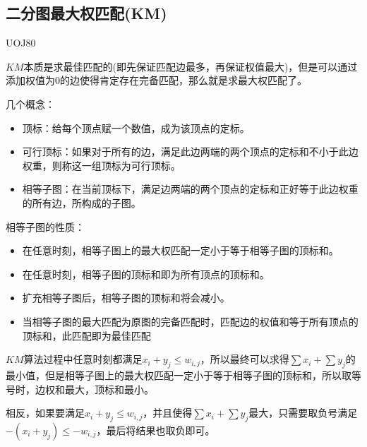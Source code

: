\subsection{二分图最大权匹配(KM)}
UOJ80\par
$KM$本质是求最佳匹配的(即先保证匹配边最多，再保证权值最大)，但是可以通过添加权值为$0$的边使得肯定存在完备匹配，那么就是求最大权匹配了。\par
几个概念：\par
\begin{itemize}
\item 顶标：给每个顶点赋一个数值，成为该顶点的定标。
\item 可行顶标：如果对于所有的边，满足此边两端的两个顶点的定标和不小于此边权重，则称这一组顶标为可行顶标。
\item 相等子图：在当前顶标下，满足边两端的两个顶点的定标和正好等于此边权重的所有边，所构成的子图。
\end{itemize}
相等子图的性质：\par
\begin{itemize}
\item 在任意时刻，相等子图上的最大权匹配一定小于等于相等子图的顶标和。
\item 在任意时刻，相等子图的顶标和即为所有顶点的顶标和。
\item 扩充相等子图后，相等子图的顶标和将会减小。
\item 当相等子图的最大匹配为原图的完备匹配时，匹配边的权值和等于所有顶点的顶标和，此匹配即为最佳匹配
\end{itemize} \par
$KM$算法过程中任意时刻都满足$x_i + y_j \leq w_{i, j}$，所以最终可以求得$\sum x_i + \sum y_j$的最小值，但是相等子图上的最大权匹配一定小于等于相等子图的顶标和，所以取等号时，边权和最大，顶标和最小。\par
相反，如果要满足$x_i + y_j \leq w_{i, j}$，并且使得$\sum x_i + \sum y_j$最大，只需要取负号满足$-(x_i + y_j) \leq -w_{i, j}$，最后将结果也取负即可。\par


